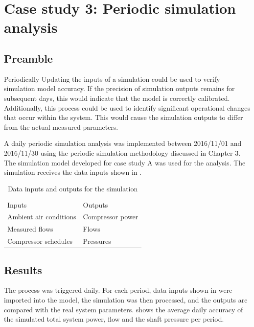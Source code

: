 \section{Case study 3: Periodic simulation analysis}
	\subsection{Preamble}
	Periodically Updating the inputs of a simulation could be used to verify simulation model accuracy. If the precision of simulation outputs remains for subsequent days, this would indicate that the model is correctly calibrated. Additionally, this process could be used to identify significant operational changes that occur within the system. This would cause the simulation outputs to differ from the actual measured parameters. 
	\par 
	A daily periodic simulation analysis was implemented between 2016/11/01 and 2016/11/30 using the periodic simulation methodology discussed in Chapter 3. The simulation model developed for case study A was used for the analysis. The simulation receives the data inputs shown in .
	\begin{table}[h!]
		\centering
		\begin{tabular}{ll}
			\hline
			Inputs \hspace*{4cm} &Outputs \hspace*{4cm} \\ \hhline{==}
			Ambient air conditions&Compressor power \\
			Measured flows& Flows \\
			Compressor schedules& Pressures \\
			\hline
		\end{tabular}
		\caption{Data inputs and outputs for the simulation}
		\label{table: Periodic inputs/outputs}
	\end{table}

\subsection{Results}

 The process was triggered daily. For each period, data inputs shown in  were imported into the model, the simulation was then processed, and the outputs are compared with the real system parameters.  shows the average daily accuracy of the simulated total system power, flow and the shaft pressure per period.
	 \par 
 
